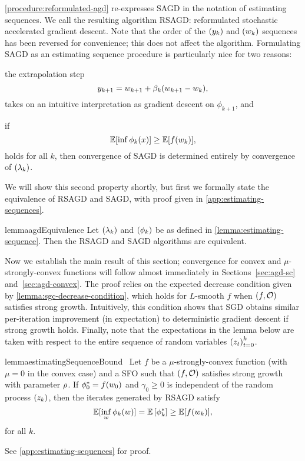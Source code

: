 \autoref{procedure:reformulated-agd} re-expresses \ac{SAGD} in the notation of estimating sequences.
We call the resulting algorithm \acs{RSAGD}: reformulated stochastic accelerated gradient descent.
Note that the order of the \( \seq{\yk} \) and \( \seq{\wk} \) sequences has been reversed for convenience; this does not affect the algorithm.
Formulating \ac{SAGD} as an estimating sequence procedure is particularly nice for two reasons:
\begin{inparaenum}[(1)]
\item the extrapolation step \[ \ykk = \wkk + \beta_k (\wkk - \wk), \] takes on an intuitive interpretation as gradient descent on \( \phi_{k+1} \), and 
\item if \[  \E [\inf \phi_k(x)] \geq \E [f(\wk)], \] holds for all \( k \), then convergence of \ac{SAGD} is determined entirely by convergence of \( \seq{\lambda_k} \).
\end{inparaenum}
We will show this second property shortly, but first we formally state the equivalence of \ac{RSAGD} and \ac{SAGD}, with proof given in \autoref{app:estimating-sequences}.

\begin{restatable}{lemma}{agdEquivalence}\label{lemma:agdEquivalence}
    Let \( \seq{\lambda_k} \) and \( \seq{\phi_k} \) be as defined in \autoref{lemma:estimating-sequence}.
    Then the \ac{RSAGD} and \ac{SAGD} algorithms are equivalent.
\end{restatable}

Now we establish the main result of this section; convergence for convex and \( \mu \)-strongly-convex functions will follow almost immediately in Sections~\ref{sec:agd-sc} and~\ref{sec:agd-convex}.
The proof relies on the expected decrease condition given by \autoref{lemma:sgc-decrease-condition}, which holds for \( L \)-smooth \( f \) when \( \rbr{f, \oracle{}} \) satisfies strong growth.
Intuitively, this condition shows that \ac{SGD} obtains similar per-iteration improvement (in expectation) to deterministic gradient descent if strong growth holds. 
Finally, note that the expectations in the lemma below are taken with respect to the entire sequence of random variables \( \seq{\z_t}_{t=0}^k \).

\begin{restatable}{lemma}{estimatingSequenceBound}~\label{lemma:estimating-sequence-bound}
    Let \( f \) be a \( \mu \)-strongly-convex function (with \( \mu = 0 \) in the convex case) and \oracle{} a \ac{SFO} such that \( \rbr{f, \oracle{}} \) satisfies strong growth with parameter \( \sgc \).
    If \( \phi_0^* = f(\w_0) \) and \( \gamma_0 \geq 0 \) is independent of the random process \( \seq{\zk} \), then the iterates generated by \ac{RSAGD} satisfy 
    \[ \E [\inf_{w} \phi_k(\w)] = \E \sbr{\phi_k^*} \geq \E [f(\wk)], \]
    for all \( k \).
\end{restatable}
\noindent See \autoref{app:estimating-sequences} for proof.

